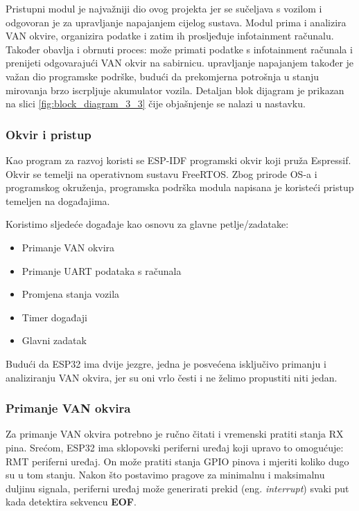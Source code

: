 Pristupni modul je najvažniji dio ovog projekta jer se sučeljava s vozilom i odgovoran je za upravljanje napajanjem cijelog sustava. 
Modul prima i analizira VAN okvire, organizira podatke i zatim ih prosljeđuje infotainment računalu. 
Također obavlja i obrnuti proces: može primati podatke s infotainment računala i prenijeti odgovarajući VAN okvir na sabirnicu. 
upravljanje napajanjem također je važan dio programske podrške, budući da prekomjerna potrošnja u stanju mirovanja brzo iscrpljuje akumulator vozila. Detaljan blok dijagram je prikazan na slici \ref{fig:block_diagram_3_3} čije objašnjenje se nalazi u nastavku.

\subsubsection{Okvir i pristup}

Kao program za razvoj koristi se ESP-IDF programski okvir koji pruža Espressif. 
Okvir se temelji na operativnom sustavu FreeRTOS. Zbog prirode OS-a i programskog okruženja, programska podrška modula napisana je 
koristeći pristup temeljen na događajima.

\bigskip
\noindent
Koristimo sljedeće događaje kao osnovu za glavne petlje/zadatake:
\begin{itemize}
\item Primanje VAN okvira
\item Primanje UART podataka s računala
\item Promjena stanja vozila
\item Timer događaji
\item Glavni zadatak
\end{itemize}

\noindent
Budući da ESP32 ima dvije jezgre, jedna je posvećena isključivo primanju i analiziranju VAN okvira, jer su oni vrlo česti i ne želimo propustiti niti jedan.

\subsubsection{Primanje VAN okvira}

Za primanje VAN okvira potrebno je ručno čitati i vremenski pratiti stanja RX pina. 
Srećom, ESP32 ima sklopovski periferni uređaj koji upravo to omogućuje: RMT periferni uređaj. 
On može pratiti stanja GPIO pinova i mjeriti koliko dugo su u tom stanju. 
Nakon što postavimo pragove za minimalnu i maksimalnu duljinu signala, periferni uređaj može generirati prekid (eng. \textit{interrupt}) svaki put kada detektira sekvencu \textbf{EOF}.

